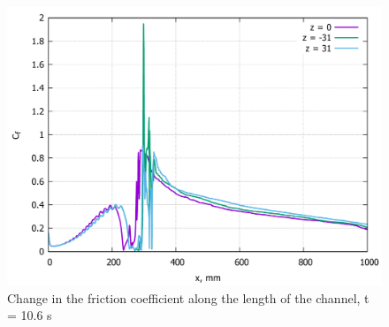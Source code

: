 	\begin{figure}[H]
		\centering
		\includegraphics[width=0.7\linewidth]{../Assets/Cf-T1060-all}
		\caption{Change in the friction coefficient along the length of the channel, t = 10.6 s}
		\label{fig:cf-t1060-all}
	\end{figure}
